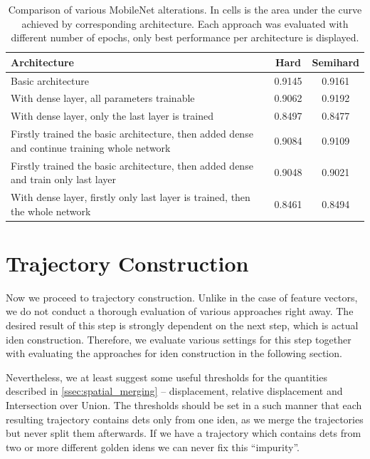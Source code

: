 \begin{table}[]
    \centering
    \begin{tabularx}{\textwidth}{X|c|c}
          Architecture & Hard & Semihard \\
          \hline
         Basic architecture & 0.9145 & 0.9161 \\
         With dense layer, all parameters trainable & 0.9062 & 0.9192 \\
         With dense layer, only the last layer is trained & 0.8497 & 0.8477 \\
         Firstly trained the basic architecture, then added dense and continue training whole network & 0.9084 & 0.9109 \\
         Firstly trained the basic architecture, then added dense and train only last layer & 0.9048 & 0.9021 \\
         With dense layer, firstly only last layer is trained, then the whole network & 0.8461 & 0.8494
    \end{tabularx}
    \caption[Comparison of various MobileNet alterations]{Comparison of various MobileNet alterations. In cells is the area under the curve achieved by corresponding architecture. Each approach was evaluated with different number of epochs, only best performance per architecture is displayed.}
    \label{tab:final_comparison}
\end{table}


\section{Trajectory Construction}

Now we proceed to trajectory construction. Unlike in the case of feature vectors, we do not conduct a thorough evaluation of various approaches right away. The desired result of this step is strongly dependent on the next step, which is actual \gls{iden} construction. Therefore, we evaluate various settings for this step together with evaluating the approaches for \gls{iden} construction in the following section.

Nevertheless, we at least suggest some useful thresholds for the quantities described in \autoref{ssec:spatial_merging} -- displacement, relative displacement and Intersection over Union. The thresholds should be set in a such manner that each resulting trajectory contains \glspl{det} only from one \gls{iden}, as we merge the trajectories but never split them afterwards. If we have a trajectory which contains \glspl{det} from two or more different golden \glspl{iden} we can never fix this ``impurity''.

